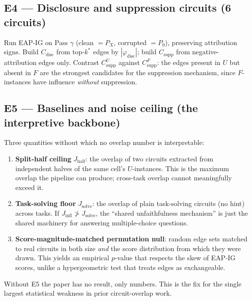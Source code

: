 \documentclass[11pt]{article}
\begin{document}
\subsection*{E4 --- Disclosure and suppression circuits (6 circuits)}
Run EAP-IG on Pass $\gamma$ (clean $=P_X$, corrupted $=P_0$), preserving attribution signs. Build $C_{\text{disc}}$ from top-$k^*$ edges by $|\varphi_{\text{disc}}|$; build $C_{\text{supp}}$ from negative-attribution edges only. Contrast $C_{\text{supp}}^U$ against $C_{\text{supp}}^F$: the edges present in $U$ but absent in $F$ are the strongest candidates for the suppression mechanism, since $F$-instances have influence \emph{without} suppression.

\subsection*{E5 --- Baselines and noise ceiling (the interpretive backbone)}
Three quantities without which no overlap number is interpretable:
\begin{enumerate}[leftmargin=1.5em, itemsep=1pt]
  \item \textbf{Split-half ceiling} $J_{\text{half}}$: the overlap of two circuits extracted from independent halves of the same cell's $U$-instances. This is the maximum overlap the pipeline can produce; cross-task overlap cannot meaningfully exceed it.
  \item \textbf{Task-solving floor} $J_{\text{solve}}$: the overlap of plain task-solving circuits (no hint) across tasks. If $J_{\text{infl}} \not> J_{\text{solve}}$, the ``shared unfaithfulness mechanism'' is just the shared machinery for answering multiple-choice questions.
  \item \textbf{Score-magnitude-matched permutation null}: random edge sets matched to real circuits in both size \emph{and} the score distribution from which they were drawn. This yields an empirical $p$-value that respects the skew of EAP-IG scores, unlike a hypergeometric test that treats edges as exchangeable.
\end{enumerate}
Without E5 the paper has no result, only numbers. This is the fix for the single largest statistical weakness in prior circuit-overlap work.
\end{document}
